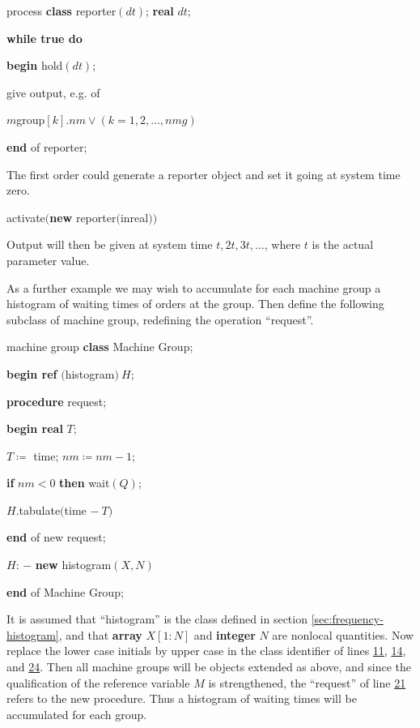 \documentclass[twoside,11pt]{book}
\begin{document}
\quad process \textbf{class} reporter$(dt)$; \textbf{real} $dt$;

\quad \textbf{while true do}

\quad \textbf{}\textbf{begin} hold$(dt)$;

\quad \quad give output, e.g. of

\quad \quad $m$group$[k].nm \lor (k = 1, 2, \dots,nmg)$

\quad \textbf{end} of reporter;

The first order could generate a reporter object and set it going at system time zero.

\quad activate$($\textbf{new} reporter$($inreal$))$

\noindent
Output will then be given at system time $t, 2t, 3t, \dots$, where $t$ is the actual parameter value.

As a further example we may wish to accumulate for each machine group a histogram of waiting times of orders at the group. Then define the following subclass of machine group, redefining the operation ``request''.

\quad machine group \textbf{class} Machine Group;

\quad \textbf{begin ref} $($histogram$)\ H$;

\quad \quad \textbf{procedure} request;

\quad \quad \textbf{begin real} $T$;

\quad \quad \quad $T\coloneq$ time; $nm\coloneq nm - 1$;

\quad \quad \quad \textbf{if} $nm < 0$ \textbf{then} wait$(Q)$;

\quad \quad \quad $H$.tabulate$($time $-\ T)$

\quad \quad \textbf{end} of new request;

\quad \quad $H$: $-$ \textbf{new} histogram$(X, N)$

\quad \textbf{end} of Machine Group;

It is assumed that ``histogram'' is the class defined in section \ref{sec:frequency-histogram}, and that \textbf{array} $X[1 : N]$ and \textbf{integer} $N$ are nonlocal quantities. Now replace the lower case initials by upper case in the class identifier of lines \hyperref[pg:program-job-shop-11]{11}, \hyperref[pg:program-job-shop-14]{14}, and \hyperref[pg:program-job-shop-24]{24}. Then all machine groups will be objects extended as above, and since the qualification of the reference variable $M$ is strengthened, the ``request'' of line \hyperref[pg:program-job-shop-21]{21} refers to the new procedure. Thus a histogram of waiting times will be accumulated for each group.
\end{document}
